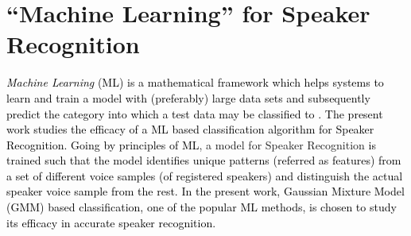 \documentclass{article}
\begin{document}
{\section{\textbf{{``Machine Learning'' for Speaker Recognition}}}
\label{MLforSR}
 \textcolor{black}{\textit{Machine Learning} (ML) is a mathematical framework which helps systems to learn and train a model with (preferably) large data sets and subsequently predict the category into which a test data may be classified to \cite{3}.} 
 \textcolor{black}{The present work studies the efficacy of a ML based classification algorithm for Speaker Recognition. Going by principles of ML}, a model for Speaker Recognition \textcolor{black}{is trained such that the model identifies unique patterns (referred as features) from a set of different voice samples (of registered speakers) and distinguish the actual speaker voice sample from the rest.} \textcolor{black}{In the present work, Gaussian Mixture Model (GMM) based classification, one of the popular ML methods, is chosen to study its efficacy in accurate speaker recognition.}
}
\end{document}
